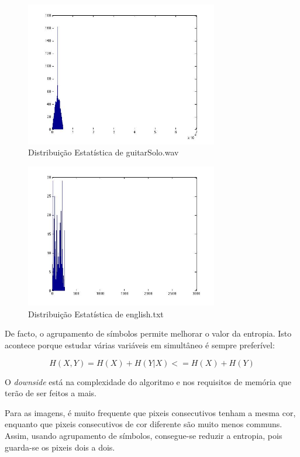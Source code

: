 \documentclass[12pt]{article}
\begin{document}
  \begin{figure}[H]
    \centering
      \includegraphics[width=0.75\textwidth]{ex5guitarsolo}
    \caption{Distribuição Estatística de guitarSolo.wav}
  \end{figure}

  \begin{figure}[H]
    \centering
      \includegraphics[width=0.75\textwidth]{ex5english}
    \caption{Distribuição Estatística de english.txt}
  \end{figure}

  De facto, o agrupamento de símbolos permite melhorar o valor
  da entropia. Isto acontece porque estudar várias variáveis em simultâneo
  é sempre preferível:

  $$ H(X ,Y) = H(X)+ H(Y|X)<= H(X)+ H(Y) $$

  O \textit{downside} está na complexidade do algoritmo e nos requisitos
  de memória que terão de ser feitos a mais.

Para as imagens, é muito frequente que pixeis consecutivos tenham a mesma cor, enquanto que pixeis consecutivos de cor diferente são muito menos communs. Assim, usando agrupamento de símbolos, consegue-se reduzir a entropia, pois guarda-se os pixeis dois a dois. 
\end{document}
